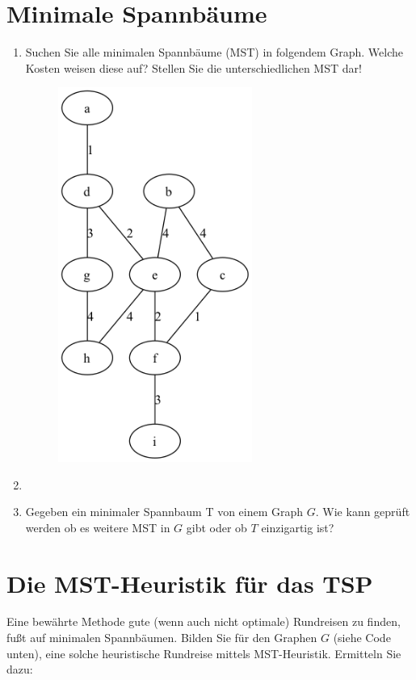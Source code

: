 \documentclass[a4paper,11pt]{report}
\begin{document}
    \chapter{Minimale Spannbäume}
    \label{ch:minSb}
    \begin{enumerate}
        \item Suchen Sie alle minimalen Spannbäume (MST) in folgendem Graph.
        Welche Kosten weisen diese auf?
        Stellen Sie die unterschiedlichen MST dar!

        \begin{figure}[H]
            \centering
            \includegraphics[width=0.6\textwidth]{a03a_graph}
            \label{fig:a03_graph}
        \end{figure}
        \item
        \item Gegeben ein minimaler Spannbaum T von einem Graph $G$.
        Wie kann geprüft werden ob es weitere MST in $G$ gibt oder ob $T$ einzigartig ist?
    \end{enumerate}

    \newpage

    \chapter{Die MST-Heuristik für das TSP}
    \label{ch:mstHeuristicTSP}
    Eine bewährte Methode gute (wenn auch nicht optimale) Rundreisen zu finden, fußt auf minimalen Spannbäumen.
    Bilden Sie für den Graphen $G$ (siehe Code unten), eine solche heuristische Rundreise mittels MST-Heuristik.
    Ermitteln Sie dazu:
\end{document}
